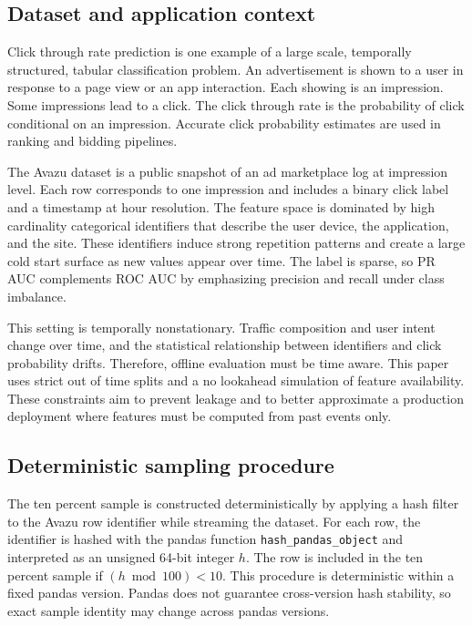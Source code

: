 \subsection*{Dataset and application context}
Click through rate prediction is one example of a large scale, temporally structured, tabular classification problem.
An advertisement is shown to a user in response to a page view or an app interaction.
Each showing is an impression.
Some impressions lead to a click.
The click through rate is the probability of click conditional on an impression.
Accurate click probability estimates are used in ranking and bidding pipelines.

The Avazu dataset is a public snapshot of an ad marketplace log at impression level.
Each row corresponds to one impression and includes a binary click label and a timestamp at hour resolution.
The feature space is dominated by high cardinality categorical identifiers that describe the user device, the application, and the site.
These identifiers induce strong repetition patterns and create a large cold start surface as new values appear over time.
The label is sparse, so PR AUC complements ROC AUC by emphasizing precision and recall under class imbalance.

This setting is temporally nonstationary.
Traffic composition and user intent change over time, and the statistical relationship between identifiers and click probability drifts.
Therefore, offline evaluation must be time aware.
This paper uses strict out of time splits and a no lookahead simulation of feature availability.
These constraints aim to prevent leakage and to better approximate a production deployment where features must be computed from past events only.

\subsection{Deterministic sampling procedure}
\label{sec:appendix_sampling}
The ten percent sample is constructed deterministically by applying a hash filter to the Avazu row identifier while streaming the dataset.
For each row, the identifier is hashed with the pandas function \texttt{hash\_pandas\_object} and interpreted as an unsigned 64-bit integer $h$.
The row is included in the ten percent sample if $(h \bmod 100) < 10$.
This procedure is deterministic within a fixed pandas version.
Pandas does not guarantee cross-version hash stability, so exact sample identity may change across pandas versions.

